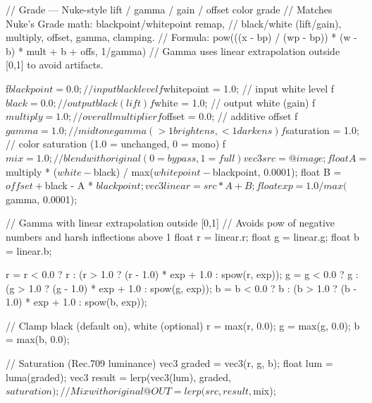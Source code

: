 // Grade — Nuke-style lift / gamma / gain / offset color grade
// Matches Nuke's Grade math: blackpoint/whitepoint remap,
// black/white (lift/gain), multiply, offset, gamma, clamping.
// Formula: pow(((x - bp) / (wp - bp)) * (w - b) * mult + b + offs, 1/gamma)
// Gamma uses linear extrapolation outside [0,1] to avoid artifacts.

f$blackpoint = 0.0;   // input black level
f$whitepoint = 1.0;   // input white level
f$black = 0.0;        // output black (lift)
f$white = 1.0;        // output white (gain)
f$multiply = 1.0;     // overall multiplier
f$offset = 0.0;       // additive offset
f$gamma = 1.0;        // midtone gamma (>1 brightens, <1 darkens)
f$saturation = 1.0;   // color saturation (1.0 = unchanged, 0 = mono)
f$mix = 1.0;          // blend with original (0 = bypass, 1 = full)

vec3 src = @image;
float A = $multiply * ($white - $black) / max($whitepoint - $blackpoint, 0.0001);
float B = $offset + $black - A * $blackpoint;

vec3 linear = src * A + B;
float exp = 1.0 / max($gamma, 0.0001);

// Gamma with linear extrapolation outside [0,1]
// Avoids pow of negative numbers and harsh inflections above 1
float r = linear.r;
float g = linear.g;
float b = linear.b;

r = r < 0.0 ? r : (r > 1.0 ? (r - 1.0) * exp + 1.0 : spow(r, exp));
g = g < 0.0 ? g : (g > 1.0 ? (g - 1.0) * exp + 1.0 : spow(g, exp));
b = b < 0.0 ? b : (b > 1.0 ? (b - 1.0) * exp + 1.0 : spow(b, exp));

// Clamp black (default on), white (optional)
r = max(r, 0.0);
g = max(g, 0.0);
b = max(b, 0.0);

// Saturation (Rec.709 luminance)
vec3 graded = vec3(r, g, b);
float lum = luma(graded);
vec3 result = lerp(vec3(lum), graded, $saturation);

// Mix with original
@OUT = lerp(src, result, $mix);
